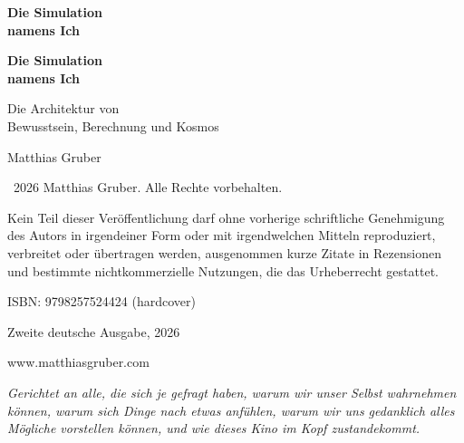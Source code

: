 \documentclass[11pt, twoside, openright]{book}
\makeatletter
\def\cleardoublepage{\clearpage\if@twoside \ifodd\c@page\else
  \thispagestyle{empty}\hbox{}\newpage
  \if@twocolumn\hbox{}\newpage\fi\fi\fi}
\makeatother
\begin{document}
\frontmatter
\pagestyle{empty}

\vspace*{3in}
\begin{center}
{\Huge\bfseries Die Simulation\\[0.3cm] namens Ich\par}
\end{center}
\cleardoublepage

\vspace*{2in}
\begin{center}
{\Huge\bfseries Die Simulation\\[0.3cm] namens Ich\par}
\vspace{0.8cm}
{\Large Die Architektur von\\[0.2cm] Bewusstsein, Berechnung und Kosmos\par}
\vspace{2cm}
{\large Matthias Gruber\par}
\end{center}
\clearpage

\thispagestyle{empty}
\vspace*{\fill}
{\small
\noindent \textcopyright\ 2026 Matthias Gruber. Alle Rechte vorbehalten.\par
\vspace{0.5cm}
\noindent Kein Teil dieser Veröffentlichung darf ohne vorherige schriftliche
Genehmigung des Autors in irgendeiner Form oder mit irgendwelchen Mitteln
reproduziert, verbreitet oder übertragen werden, ausgenommen kurze Zitate
in Rezensionen und bestimmte nichtkommerzielle Nutzungen, die das
Urheberrecht gestattet.\par
\vspace{0.5cm}
\noindent ISBN: 9798257524424 (hardcover)\par
\vspace{0.5cm}
\noindent Zweite deutsche Ausgabe, 2026\par
\vspace{0.5cm}
\noindent www.matthiasgruber.com\par
}
\cleardoublepage

\thispagestyle{empty}
\vspace*{3in}
\begin{center}
\begin{minipage}{0.75\textwidth}
\centering
\textit{Gerichtet an alle, die sich je gefragt haben, warum wir unser Selbst
wahrnehmen können, warum sich Dinge nach etwas anfühlen, warum wir uns
gedanklich alles Mögliche vorstellen können, und wie dieses Kino im Kopf
zustandekommt.}
\end{minipage}
\end{center}
\cleardoublepage
\end{document}
